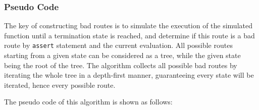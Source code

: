 \subsubsection{Pseudo Code}

The key of constructing bad routes is to simulate the execution of the simulated function until a termination state is reached, and determine if this route is a bad route by \lstinline|assert| statement and the current evaluation.
All possible routes starting from a given state can be considered as a tree, while the given state being the root of the tree. The algorithm collects all possible bad routes by iterating the whole tree in a depth-first manner,
guaranteeing every state will be iterated, hence every possible route.

The pseudo code of this algorithm is shown as follows:

